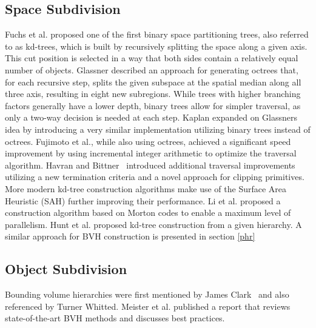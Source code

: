 \subsection{Space Subdivision}
Fuchs et al.\cite{fuchs1980bsp} proposed one of the first binary space partitioning trees, also referred to as kd-trees, which is built by recursively splitting the space along a given axis. This cut position is selected in a way that both sides contain a relatively equal number of objects. Glassner\cite{glassner_space_1984} described an approach for generating octrees that, for each recursive step, splits the given subspace at the spatial median along all three axis, resulting in eight new subregions. While trees with higher branching factors generally have a lower depth, binary trees allow for simpler traversal, as only a two-way decision is needed at each step. Kaplan\cite{kaplan_use_1985} expanded on Glassners idea by introducing a very similar implementation utilizing binary trees instead of octrees. Fujimoto et al.\cite{fujimoto_arts_1986}, while also using octrees, achieved a significant speed improvement by using incremental integer arithmetic to optimize the traversal algorithm. Havran and Bittner~\cite{Havran02onimproving} introduced additional traversal improvements utilizing a new termination criteria and a novel approach for clipping primitives. More modern kd-tree construction algorithms\cite{roccia2012kdtree,choi2010sahKdTree,wu2011sahKdTree} make use of the Surface Area Heuristic (SAH)\cite{goldsmith_automatic_1987,macdonald_heuristics_1990} further improving their performance. Li et al.\cite{li17parallelKD} proposed a construction algorithm based on Morton codes\cite{morton66curve} to enable a maximum level of parallelism. Hunt et al.\cite{hunt07lazybuild} proposed kd-tree construction from a given hierarchy. A similar approach for BVH construction is presented in section \ref{phr}
\subsection{Object Subdivision}
Bounding volume hierarchies were first mentioned by James Clark~\cite{clark1976bvh} and also referenced by Turner Whitted\cite{whitted_improved_1980}. Meister et al.\cite{meister21survey} published a report that reviews state-of-the-art BVH methods and discusses best practices. 

